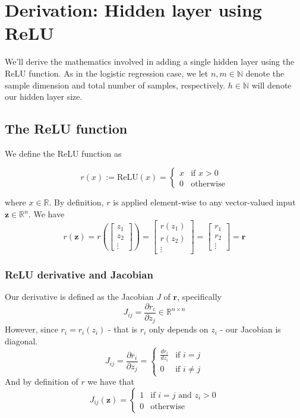 \documentclass[varwidth,border=2cm]{standalone}
\begin{document}
\section{Derivation: Hidden layer using ReLU}

We'll derive the mathematics involved in adding a single hidden layer using the ReLU function. As in the logistic regression case, we let $n,m \in \mathbb{N}$ denote the sample dimension and total number of samples, respectively. $h \in \mathbb{N}$ will denote our hidden layer size. 

\subsection{The ReLU function}
We define the ReLU function as

\[
r(x) := \text{ReLU}(x) =
\begin{cases}
x & \text{if } x > 0 \\
0 & \text{otherwise}
\end{cases}
\]

where $x \in \mathbb{R}$. By definition, $r$ is applied element-wise to any vector-valued input $\bm z \in \mathbb{R}^n$. We have
\[
r(\bm z) =
r\left(
\begin{bmatrix}
z_1 \\
z_2 \\
\vdots
\end{bmatrix}
\right)
=
\begin{bmatrix}
r(z_1) \\
r(z_2) \\
\vdots
\end{bmatrix}
=
\begin{bmatrix}
r_1 \\
r_2 \\
\vdots
\end{bmatrix}
= \bm r
\]

\subsubsection{ReLU derivative and Jacobian}
Our derivative is defined as the Jacobian $J$ of $\bm r$, specifically
\begin{equation}
J_{ij} = \frac{\partial r_i}{\partial z_j} \in \mathbb{R}^{n \times n} \nonumber
\end{equation}
However, since $r_i = r_i(z_i)$ - that is $r_i$ only depends on $z_i$ - our Jacobian is diagonal.
\[
J_{ij} = \frac{\partial r_i}{\partial z_j} =
\begin{cases}
\frac{d r_i}{d z_i} & \text{if } i = j \\
0 & \text{if } i \ne j
\end{cases}
\]
And by definition of $r$ we have that
\begin{equation}
J_{ij}(\bm z) = 
\begin{cases}
1 & \text{if } i = j \text{ and } z_i > 0 \\
0 & \text{otherwise }
\end{cases}
\end{equation}
\end{document}
